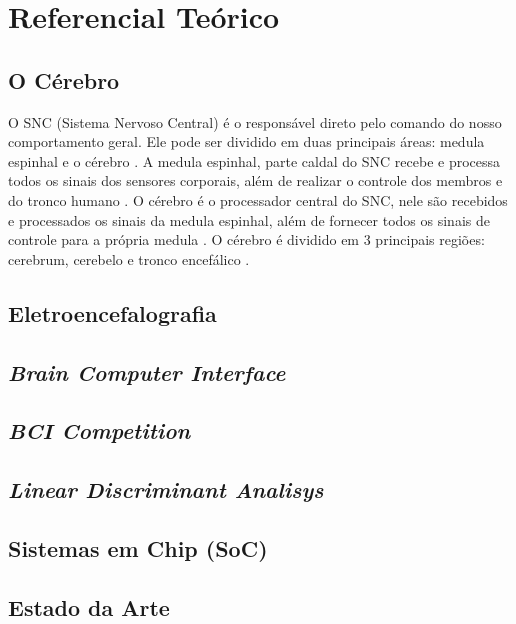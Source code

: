 
\chapter[Referencial Teórico]{Referencial Teórico}

\section{O Cérebro}
O SNC (Sistema Nervoso Central) é o responsável direto pelo comando do nosso comportamento geral\cite{David_Clarck}. Ele pode ser dividido em duas principais áreas: medula espinhal e o cérebro \cite{KANDEL}.
A medula espinhal, parte caldal do SNC recebe e processa todos os sinais dos sensores corporais, além de realizar o controle dos membros e do tronco humano \cite{KANDEL}.
O cérebro é o processador central do SNC, nele são recebidos e processados os sinais da medula espinhal, além de fornecer todos os sinais de controle para a própria medula \cite{KANDEL}. O cérebro é dividido em 3 principais regiões: cerebrum, cerebelo e tronco encefálico \cite{SIULYDissertacao}.
\section{Eletroencefalografia}

\section{\textit{Brain Computer Interface}}

\section{\textit{BCI Competition}}

\section{\textit{Linear Discriminant Analisys}}

\section{Sistemas em Chip (SoC)}

\section{Estado da Arte}



